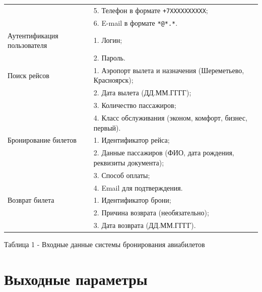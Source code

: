 \begin{longtable}{|p{6cm}|p{10.5cm}|}
    & 5. Телефон в формате \texttt{+7XXXXXXXXXX};\\
    & 6. E-mail в формате \texttt{*@*.*}. \\
    \hline
    Аутентификация пользователя &
    1. Логин;\\
    & 2. Пароль. \\
    \hline
    Поиск рейсов &
    1. Аэропорт вылета и назначения (Шереметьево, Красноярск);\\
    & 2. Дата вылета (ДД.ММ.ГГГГ);\\
    & 3. Количество пассажиров;\\
    & 4. Класс обслуживания (эконом, комфорт, бизнес, первый). \\
    \hline
    Бронирование билетов &
    1. Идентификатор рейса;\\
    & 2. Данные пассажиров (ФИО, дата рождения, реквизиты документа);\\
    & 3. Способ оплаты;\\
    & 4. Email для подтверждения. \\
    \hline
    Возврат билета &
    1. Идентификатор брони;\\
    & 2. Причина возврата (необязательно);\\
    & 3. Дата возврата (ДД.ММ.ГГГГ). \\
    \hline
\end{longtable}

Таблица 1 - Входные данные системы бронирования авиабилетов

\clearpage
\section*{Выходные параметры}

